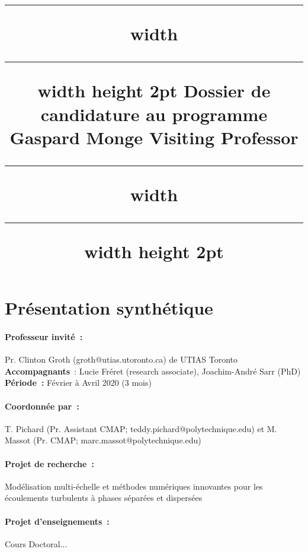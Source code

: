 \documentclass[12pt]{article}
\date{}
\title{\vspace{-1cm}\hrule width \hsize \kern 1mm \hrule width \hsize height 2pt \vspace{5mm}
  Dossier de candidature au programme \og{}Gaspard Monge Visiting Professor\fg{} \\ 
  \vspace{5mm}\hrule width \hsize \kern 1mm \hrule width \hsize height 2pt \vspace{5mm}}
\author{}
\begin{document}
\vspace{-10cm}
\maketitle

\section{Présentation synthétique}

\paragraph{Professeur invité~:} Pr. Clinton Groth (groth@utias.utoronto.ca) de UTIAS Toronto\\
\textbf{Accompagnants}~: Lucie Fréret (research associate), Joachim-André Sarr (PhD) \\
\textbf{Période~:} Février à Avril 2020 (3 mois)

\paragraph{Coordonnée par~:} T. Pichard (Pr. Assistant CMAP; teddy.pichard@polytechnique.edu) et M. Massot (Pr. CMAP; marc.massot@polytechnique.edu)

\paragraph{Projet de recherche~:}
Modélisation multi-échelle et méthodes numériques innovantes pour les écoulements turbulents à phases séparées et dispersées

\paragraph{Projet d'enseignements~:}
Cours Doctoral...
\end{document}
